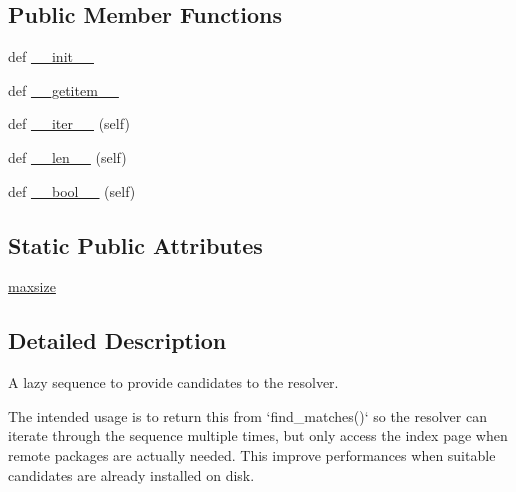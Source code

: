 \subsection*{Public Member Functions}
\begin{DoxyCompactItemize}
\item 
def \hyperlink{classpip_1_1__internal_1_1resolution_1_1resolvelib_1_1found__candidates_1_1FoundCandidates_afe7969035db73cbc740db7bded5bc325}{\+\_\+\+\_\+init\+\_\+\+\_\+}
\item 
def \hyperlink{classpip_1_1__internal_1_1resolution_1_1resolvelib_1_1found__candidates_1_1FoundCandidates_a47434afaa314b70b83444086f64789d4}{\+\_\+\+\_\+getitem\+\_\+\+\_\+}
\item 
def \hyperlink{classpip_1_1__internal_1_1resolution_1_1resolvelib_1_1found__candidates_1_1FoundCandidates_a5427eeef2f0b83a2729c28d1e7ae6fcf}{\+\_\+\+\_\+iter\+\_\+\+\_\+} (self)
\item 
def \hyperlink{classpip_1_1__internal_1_1resolution_1_1resolvelib_1_1found__candidates_1_1FoundCandidates_aec51b736a3ea58dd8669280d3ac731c5}{\+\_\+\+\_\+len\+\_\+\+\_\+} (self)
\item 
def \hyperlink{classpip_1_1__internal_1_1resolution_1_1resolvelib_1_1found__candidates_1_1FoundCandidates_ad8a21f0ca93568b9ffe2d4d7bb080662}{\+\_\+\+\_\+bool\+\_\+\+\_\+} (self)
\end{DoxyCompactItemize}
\subsection*{Static Public Attributes}
\begin{DoxyCompactItemize}
\item 
\hyperlink{classpip_1_1__internal_1_1resolution_1_1resolvelib_1_1found__candidates_1_1FoundCandidates_a2733380d0b248d5c6ad7aeeb204ae90d}{maxsize}
\end{DoxyCompactItemize}


\subsection{Detailed Description}
\begin{DoxyVerb}A lazy sequence to provide candidates to the resolver.

The intended usage is to return this from `find_matches()` so the resolver
can iterate through the sequence multiple times, but only access the index
page when remote packages are actually needed. This improve performances
when suitable candidates are already installed on disk.
\end{DoxyVerb}
 

